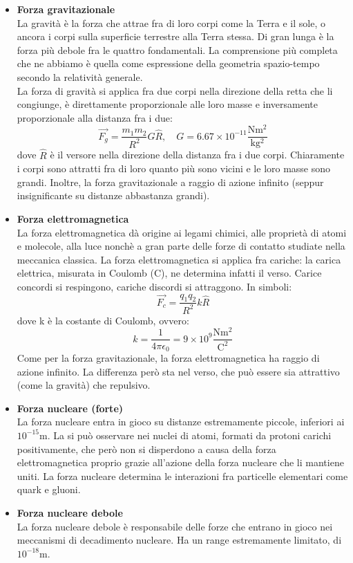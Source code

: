 \documentclass[a4paper,12pt]{article}
\begin{document}
\begin{itemize}
  \item \textbf{Forza gravitazionale} \\
    La gravità è la forza che attrae fra di loro corpi come la Terra e il sole, o ancora i corpi sulla superficie terrestre alla Terra stessa.
    Di gran lunga è la forza più debole fra le quattro fondamentali. La comprensione più completa che ne abbiamo
    è quella come espressione della geometria spazio-tempo secondo la relatività generale.\\
    La forza di gravità si applica fra due corpi nella direzione della retta che li congiunge, è direttamente
    proporzionale alle loro masse e inversamente proporzionale alla distanza fra i due:
    $$ \vec{F_g} = \frac{m_1m_2}{R^2}G\hat{R}, \quad G = 6.67\times 10^{-11} \mathrm{\frac{Nm^2}{kg^2}} $$
    dove $\hat{R}$ è il versore nella direzione della distanza fra i due corpi. Chiaramente i corpi sono attratti fra di loro
    quanto più sono vicini e le loro masse sono grandi. Inoltre, la forza gravitazionale a raggio di azione infinito (seppur insignificante
    su distanze abbastanza grandi).
  \item \textbf{Forza elettromagnetica} \\
    La forza elettromagnetica dà origine ai legami chimici, alle proprietà di atomi e molecole, alla luce nonchè a gran parte
    delle forze di contatto studiate nella meccanica classica. La forza elettromagnetica si applica fra cariche: 
    la carica elettrica, misurata in Coulomb (C), ne determina infatti il verso. Carice concordi si respingono, cariche
    discordi si attraggono. In simboli:
    $$ \vec{F_c} = \frac{q_1q_2}{R^2}k\hat{R} $$
    dove k è la costante di Coulomb, ovvero:
    $$ k = \frac{1}{4\pi\epsilon_0} = 9 \times 10^9 \mathrm{\frac{Nm^2}{C^2}} $$
    Come per la forza gravitazionale, la forza elettromagnetica ha raggio di azione infinito. La differenza però sta nel verso, che può essere
    sia attrattivo (come la gravità) che repulsivo.
  \item \textbf{Forza nucleare (forte)} \\
    La forza nucleare entra in gioco su distanze estremamente piccole, inferiori ai $10^{-15} \mathrm{m}$. La si può osservare
    nei nuclei di atomi, formati da protoni carichi positivamente, che però non si disperdono a causa della forza elettromagnetica proprio
    grazie all'azione della forza nucleare che li mantiene uniti. La forza nucleare determina le interazioni fra particelle elementari come
    quark e gluoni.
  \item \textbf{Forza nucleare debole} \\
    La forza nucleare debole è responsabile delle forze che entrano in gioco nei meccanismi di decadimento nucleare. Ha un range estremamente limitato,
    di $10^{-18} \mathrm{m}$.
\end{itemize}
\end{document}
